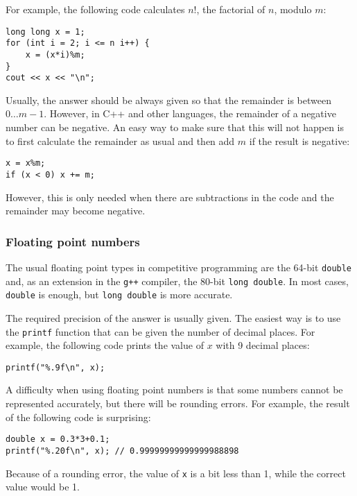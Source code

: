 For example, the following code calculates $n!$,
the factorial of $n$, modulo $m$:
\begin{lstlisting}
long long x = 1;
for (int i = 2; i <= n i++) {
    x = (x*i)%m;
}
cout << x << "\n";
\end{lstlisting}

Usually, the answer should be always given so
that the remainder is between $0\ldots m-1$.
However, in C++ and other languages,
the remainder of a negative number can
be negative.
An easy way to make sure that this will
not happen is to first calculate
the remainder as usual and then add $m$
if the result is negative:
\begin{lstlisting}
x = x%m;
if (x < 0) x += m;
\end{lstlisting}
However, this is only needed when there
are subtractions in the code and the
remainder may become negative.

\subsubsection{Floating point numbers}


The usual floating point types in
competitive programming are
the 64-bit \texttt{double}
and, as an extension in the \texttt{g++} compiler,
the 80-bit \texttt{long double}.
In most cases, \texttt{double} is enough,
but \texttt{long double} is more accurate.

The required precision of the answer
is usually given.
The easiest way is to use
the \texttt{printf} function
that can be given the number of decimal places.
For example, the following code prints
the value of $x$ with 9 decimal places:

\begin{lstlisting}
printf("%.9f\n", x);
\end{lstlisting}

A difficulty when using floating point numbers
is that some numbers cannot be represented
accurately, but there will be rounding errors.
For example, the result of the following code
is surprising:

\begin{lstlisting}
double x = 0.3*3+0.1;
printf("%.20f\n", x); // 0.99999999999999988898
\end{lstlisting}

Because of a rounding error,
the value of \texttt{x} is a bit less than 1,
while the correct value would be 1.

